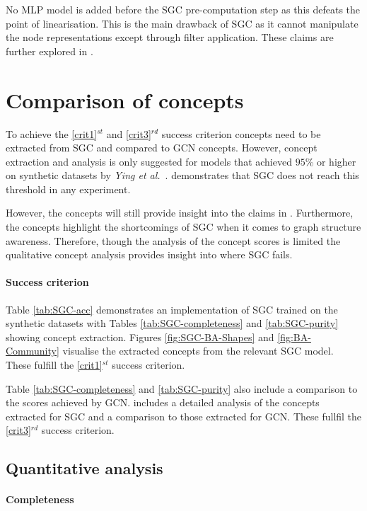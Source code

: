 No MLP model is added before the SGC pre-computation step as this defeats the point of linearisation.
This is the main drawback of SGC as it cannot manipulate the node representations except through filter application.
These claims are further explored in .

\section{Comparison of concepts}
\label{sec:comp-concept}

To achieve the \ref{crit1}$^{st}$ and \ref{crit3}$^{rd}$ success criterion concepts need to be extracted from SGC and compared to GCN concepts.
However, concept extraction and analysis is only suggested for models that achieved $95$\% or higher on synthetic datasets by \textit{Ying et al.}~\cite{ying2019gnnexplainer}.
 demonstrates that SGC does not reach this threshold in any experiment.

However, the concepts will still provide insight into the claims in .
Furthermore, the concepts highlight the shortcomings of SGC when it comes to graph structure awareness.
Therefore, though the analysis of the concept scores is limited the qualitative concept analysis provides insight into where SGC fails.

\paragraph{Success criterion}
Table \ref{tab:SGC-acc} demonstrates an implementation of SGC trained on the synthetic datasets with Tables \ref{tab:SGC-completeness} and \ref{tab:SGC-purity} showing concept extraction.
Figures \ref{fig:SGC-BA-Shapes} and \ref{fig:BA-Community} visualise the extracted concepts from the relevant SGC model. These fulfill the \ref{crit1}$^{st}$ success criterion.

Table \ref{tab:SGC-completeness} and \ref{tab:SGC-purity} also include a comparison to the scores achieved by GCN.
 includes a detailed analysis of the concepts extracted for SGC and a comparison to those extracted for GCN.
These fullfil the \ref{crit3}$^{rd}$ success criterion.

\subsection{Quantitative analysis}
\label{sec:quant}
\paragraph{Completeness}


